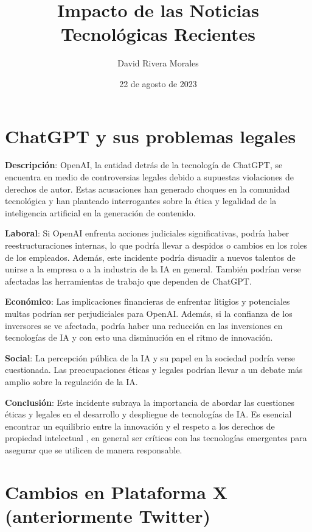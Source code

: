\documentclass{article}
\begin{document}
\title{Impacto de las Noticias Tecnológicas Recientes}
\author{David Rivera Morales}
\date{22 de agosto de 2023}
\maketitle

\section*{ChatGPT y sus problemas legales}

\textbf{Descripción}: OpenAI, la entidad detrás de la  tecnología de ChatGPT, se encuentra en medio de controversias legales debido a supuestas violaciones de derechos de autor. Estas acusaciones han generado choques en la comunidad tecnológica y han planteado interrogantes sobre la ética y legalidad de la inteligencia artificial en la generación de contenido.

\textbf{Laboral}: Si OpenAI enfrenta acciones judiciales significativas, podría haber reestructuraciones internas, lo que podría llevar a despidos o cambios en los roles de los empleados. Además, este incidente podría disuadir a nuevos talentos de unirse a la empresa o a la industria de la IA en general. También podrían verse afectadas las herramientas de trabajo que dependen de ChatGPT.

\textbf{Económico}: Las implicaciones financieras de enfrentar litigios y potenciales multas podrían ser perjudiciales para OpenAI. Además, si la confianza de los inversores se ve afectada, podría haber una reducción en las inversiones en tecnologías de IA y con esto una disminución en el ritmo de innovación.

\textbf{Social}: La percepción pública de la IA y su papel en la sociedad podría verse cuestionada. Las preocupaciones éticas y legales podrían llevar a un debate más amplio sobre la regulación de la IA.

\textbf{Conclusión}: Este incidente subraya la importancia de abordar las cuestiones éticas y legales en el desarrollo y despliegue de tecnologías de IA. Es esencial encontrar un equilibrio entre la innovación y el respeto a los derechos de propiedad intelectual , en general ser críticos con las tecnologías emergentes para asegurar que se utilicen de manera responsable.

\section*{Cambios en Plataforma X (anteriormente Twitter)}
\end{document}
